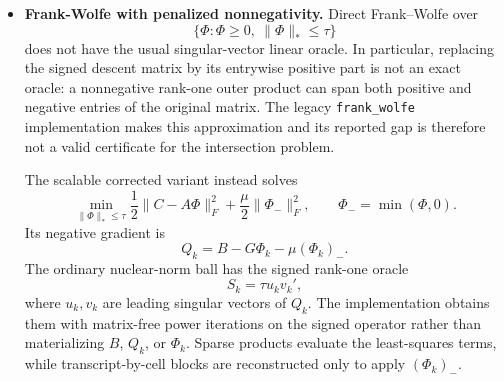 \documentclass[11pt]{article}
\begin{document}
\begin{itemize}[leftmargin=*]
  Conditional on the transcript factors, the cell-factor primal subproblem has
  only an \(r\)-by-\(r\) Hessian. The implementation Cholesky-factorizes this
  Hessian once per epoch and solves every cached cell block exactly. The
  transcript-factor gradient and its Lipschitz curvature are both divided by
  the number of nonempty cells; its step is therefore the reciprocal of the
  correspondingly scaled curvature. An absolute step cap after this averaging
  would make optimization slower in direct proportion to the dataset size
  while allowing the split residuals to become small, so no such cap is used.

  Both ADMM implementations can adapt \(\rho\) by residual balancing. Every
  configured interval, let \(r\) be the primal split residual and \(s\) the
  dual residual. If \(\|r\|>\eta\|s\|\), multiply \(\rho\) by \(\kappa\); if
  \(\|s\|>\eta\|r\|\), divide it by \(\kappa\). The scaled dual variable is
  multiplied by the old-to-new \(\rho\) ratio so that its unscaled value is
  unchanged. The implementation defaults to \(\eta=10\), \(\kappa=2\), and an
  update every ten iterations, and records the complete \(\rho\) history.

  \item \textbf{Frank-Wolfe with penalized nonnegativity.} Direct
  Frank--Wolfe over
  \[
    \{\Phi:\Phi\geq 0,\ \|\Phi\|_*\leq\tau\}
  \]
  does not have the usual singular-vector linear oracle. In particular,
  replacing the signed descent matrix by its entrywise positive part is not an
  exact oracle: a nonnegative rank-one outer product can span both positive and
  negative entries of the original matrix. The legacy \texttt{frank\_wolfe}
  implementation makes this approximation and its reported gap is therefore
  not a valid certificate for the intersection problem.

  The scalable corrected variant instead solves
  \[
    \min_{\|\Phi\|_*\le\tau}
    \frac{1}{2}\|C-A\Phi\|_F^2
    +\frac{\mu}{2}\|\Phi_-\|_F^2,
    \qquad \Phi_-=\min(\Phi,0).
  \]
  Its negative gradient is
  \[
    Q_k=B-G\Phi_k-\mu(\Phi_k)_-.
  \]
  The ordinary nuclear-norm ball has the signed rank-one oracle
  \[
    S_k=\tau u_kv_k',
  \]
  where \(u_k,v_k\) are leading singular vectors of \(Q_k\). The implementation
  obtains them with matrix-free power iterations on the signed operator rather
  than materializing \(B\), \(Q_k\), or \(\Phi_k\). Sparse products evaluate
  the least-squares terms, while transcript-by-cell blocks are reconstructed
  only to apply \((\Phi_k)_-\).


\end{itemize}
\end{document}
